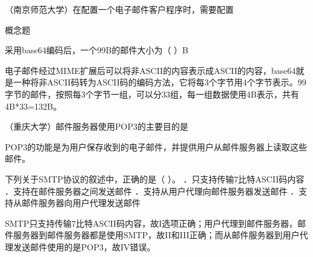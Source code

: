 \question （南京师范大学）在配置一个电子邮件客户程序时，需要配置
\par{}
\begin{solution}概念题
\end{solution}
\question 采用base64编码后，一个99B的邮件大小为（ ）B
\par{}
\begin{solution}电子邮件经过MIME扩展后可以将非ASCII的内容表示成ASCII的内容，base64就是一种将非ASCII码转为ASCII码的编码方法，它将每3个字节用4个字节表示。99字节的邮件，按照每3个字节一组，可以分33组，每一组数据使用4B表示，共有4B*33=132B。
\end{solution}
\question （重庆大学）邮件服务器使用POP3的主要目的是
\par{}
\begin{solution}POP3的功能是为用户保存收到的电子邮件，并提供用户从邮件服务器上读取这些邮件。
\end{solution}
\question 下列关于SMTP协议的叙述中，正确的是（ ）。 ．只支持传输7比特ASCII码内容
．支持在邮件服务器之间发送邮件 ．支持从用户代理向邮件服务器发送邮件
．支持从邮件服务器向用户代理发送邮件
\par{}
\begin{solution}SMTP只支持传输7比特ASCII码内容，故I选项正确；用户代理到邮件服务器，邮件服务器到邮件服务器都是使用SMTP，故II和III正确；而从邮件服务器到用户代理发送邮件使用的是POP3，故IV错误。
\end{solution}
